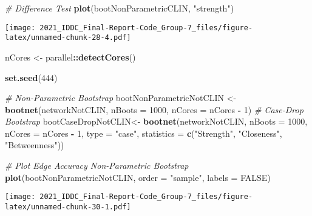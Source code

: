 \documentclass[
]{article}
\newenvironment{Shaded}{\begin{snugshade}}{\end{snugshade}}
\newcommand{\CommentTok}[1]{\textcolor[rgb]{0.56,0.35,0.01}{\textit{#1}}}
\newcommand{\DataTypeTok}[1]{\textcolor[rgb]{0.13,0.29,0.53}{#1}}
\newcommand{\DecValTok}[1]{\textcolor[rgb]{0.00,0.00,0.81}{#1}}
\newcommand{\KeywordTok}[1]{\textcolor[rgb]{0.13,0.29,0.53}{\textbf{#1}}}
\newcommand{\NormalTok}[1]{#1}
\newcommand{\OperatorTok}[1]{\textcolor[rgb]{0.81,0.36,0.00}{\textbf{#1}}}
\newcommand{\OtherTok}[1]{\textcolor[rgb]{0.56,0.35,0.01}{#1}}
\newcommand{\StringTok}[1]{\textcolor[rgb]{0.31,0.60,0.02}{#1}}
\begin{document}
\begin{Shaded}
\begin{Highlighting}[]
\CommentTok{# Difference Test}
\KeywordTok{plot}\NormalTok{(bootNonParametricCLIN, }\StringTok{"strength"}\NormalTok{)}
\end{Highlighting}
\end{Shaded}

\texttt{[image: 2021\_IDDC\_Final-Report-Code\_Group-7\_files/figure-latex/unnamed-chunk-28-4.pdf]}

\begin{Shaded}
\begin{Highlighting}[]
\NormalTok{nCores <-}\StringTok{ }\NormalTok{parallel}\OperatorTok{::}\KeywordTok{detectCores}\NormalTok{()}

\KeywordTok{set.seed}\NormalTok{(}\DecValTok{444}\NormalTok{)}

\CommentTok{# Non-Parametric Bootstrap}
\NormalTok{bootNonParametricNotCLIN <-}\StringTok{ }\KeywordTok{bootnet}\NormalTok{(networkNotCLIN,}
                             \DataTypeTok{nBoots =} \DecValTok{1000}\NormalTok{,}
                             \DataTypeTok{nCores =}\NormalTok{ nCores }\OperatorTok{-}\StringTok{ }\DecValTok{1}\NormalTok{)}
\CommentTok{# Case-Drop Bootstrap}
\NormalTok{bootCaseDropNotCLIN<-}\StringTok{ }\KeywordTok{bootnet}\NormalTok{(networkNotCLIN,}
                        \DataTypeTok{nBoots =} \DecValTok{1000}\NormalTok{,}
                        \DataTypeTok{nCores =}\NormalTok{ nCores }\OperatorTok{-}\StringTok{ }\DecValTok{1}\NormalTok{,}
                        \DataTypeTok{type =} \StringTok{"case"}\NormalTok{,}
                        \DataTypeTok{statistics =} \KeywordTok{c}\NormalTok{(}\StringTok{"Strength"}\NormalTok{, }\StringTok{"Closeness"}\NormalTok{, }\StringTok{"Betweenness"}\NormalTok{))}
\end{Highlighting}
\end{Shaded}

\begin{Shaded}
\begin{Highlighting}[]
\CommentTok{# Plot Edge Accuracy Non-Parametric Bootstrap}
\KeywordTok{plot}\NormalTok{(bootNonParametricNotCLIN,}
     \DataTypeTok{order =} \StringTok{"sample"}\NormalTok{,}
     \DataTypeTok{labels =} \OtherTok{FALSE}\NormalTok{)}
\end{Highlighting}
\end{Shaded}

\texttt{[image: 2021\_IDDC\_Final-Report-Code\_Group-7\_files/figure-latex/unnamed-chunk-30-1.pdf]}
\end{document}
